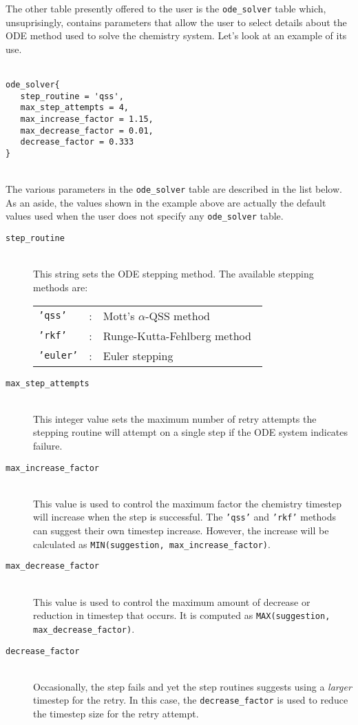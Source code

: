 The other table presently offered to the user is the \texttt{ode\_solver} table which,
unsuprisingly, contains parameters that allow the user to select details
about the ODE method used to solve the chemistry system.
Let's look at an example of its use.\\
%
\topbar\\
\begin{verbatim}
ode_solver{
   step_routine = 'qss',
   max_step_attempts = 4,
   max_increase_factor = 1.15,
   max_decrease_factor = 0.01,
   decrease_factor = 0.333
}
\end{verbatim}
\bottombar\\
%
The various parameters in the \texttt{ode\_solver} table are described
in the list below.
As an aside, the values shown in the example above are actually the default
values used when the user does not specify any \texttt{ode\_solver} table.
\begin{description}
\item[\texttt{step\_routine}] \hspace{1cm} \\
   This string sets the ODE stepping method. The available stepping methods are: \\
   \begin{tabular}{lll}
    \texttt{'qss'} & : & Mott's $\alpha$-QSS method~\cite{mott_99a} \\
    \texttt{'rkf'} & : & Runge-Kutta-Fehlberg method~\cite{fehlberg_69a} \\
    \texttt{'euler'} & : & Euler stepping \\
   \end{tabular}
\item[\texttt{max\_step\_attempts}] \hspace{1cm} \\
    This integer value sets the maximum number of retry attempts the stepping
    routine will attempt on a single step if the ODE system indicates failure.
\item[\texttt{max\_increase\_factor}] \hspace{1cm} \\
    This value is used to control the maximum factor the chemistry timestep
    will increase when the step is successful.  The \texttt{'qss'} and \texttt{'rkf'}
    methods can suggest their own timestep increase. However, the increase will
    be calculated as \texttt{MIN(suggestion, max\_increase\_factor)}.
\item[\texttt{max\_decrease\_factor}] \hspace{1cm} \\
    This value is used to control the maximum amount of decrease or reduction
    in timestep that occurs.  It is computed as \texttt{MAX(suggestion, max\_decrease\_factor)}.
\item[\texttt{decrease\_factor}] \hspace{1cm} \\
    Occasionally, the step fails and yet the step routines suggests using a \emph{larger}
    timestep for the retry.  In this case, the \texttt{decrease\_factor} is used to reduce
    the timestep size for the retry attempt.
\end{description}


